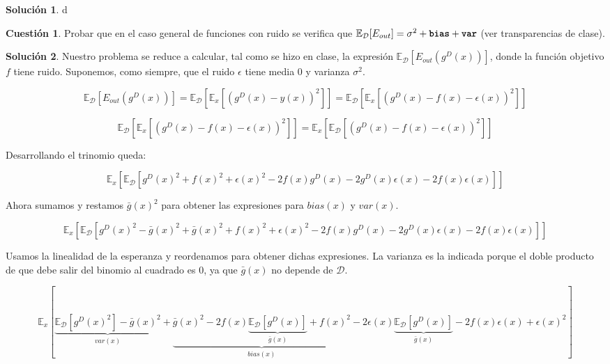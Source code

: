 \documentclass[a4paper, 11pt]{article}
\theoremstyle{definition}
\newtheorem{cuestion}{Cuestión}
\newtheorem*{solucion}{Solución}
\begin{document}
  \begin{solucion}
    d
  \end{solucion}

  \begin{cuestion}
    Probar que en el caso general de funciones con ruido se verifica que $\mathbb{E}_{\mathcal{D}}[E_{out}]= \sigma^2+\texttt{\textbf{bias}}+\texttt{\textbf{var}}$ (ver transparencias de clase).

  \end{cuestion}

  \begin{solucion}
    Nuestro problema se reduce a calcular, tal como se hizo en clase, la expresión $\mathbb{E}_{\mathcal{D}}[E_{out}(g^D(x))]$, donde la función objetivo $f$ tiene ruido. Suponemos, como siempre, que el ruido $\epsilon$ tiene media 0 y varianza $\sigma^2$.

    $$\mathbb{E}_{\mathcal{D}}\left[E_{out}\left(g^D(x)\right) \right] = \mathbb{E}_{\mathcal{D}} \left[\mathbb{E}_x \left[ \left(g^D(x) - y(x) \right)^ 2  \right] \right] = \mathbb{E}_{\mathcal{D}} \left[\mathbb{E}_x \left[ \left(g^D(x) - f(x) - \epsilon(x) \right)^ 2  \right] \right] $$

    $$ \mathbb{E}_{\mathcal{D}} \left[\mathbb{E}_x \left[ \left(g^D(x) - f(x) - \epsilon(x) \right)^ 2  \right] \right] = \mathbb{E}_x \left[\mathbb{E}_{\mathcal{D}} \left[ \left(g^D(x) - f(x) - \epsilon(x) \right)^ 2  \right] \right] $$

    Desarrollando el trinomio queda:

    $$ \mathbb{E}_x \left[\mathbb{E}_{\mathcal{D}} \left[ g^D(x)^2 + f(x)^2 + \epsilon(x)^2 - 2f(x)g^D(x) - 2g^D(x)\epsilon(x) - 2f(x)\epsilon(x) \right] \right]  $$

    Ahora sumamos y restamos $\bar{g}(x)^2$ para obtener las expresiones para $bias(x)$ y $var(x)$.

    $$ \mathbb{E}_x \left[\mathbb{E}_{\mathcal{D}} \left[ g^D(x)^2 - \bar{g}(x)^2 + \bar{g}(x)^2 + f(x)^2 + \epsilon(x)^2 - 2f(x)g^D(x) - 2g^D(x)\epsilon(x) - 2f(x)\epsilon(x) \right] \right] $$

    Usamos la linealidad de la esperanza y reordenamos para obtener dichas expresiones. La varianza es la indicada porque el doble producto de que debe salir del binomio al cuadrado es $0$, ya que $\bar{g}(x)$ no depende de $\mathcal{D}$.

    $$ \mathbb{E}_x \left[ \underbrace{\mathbb{E}_{\mathcal{D}} \left[ g^D(x)^2 \right] - \bar{g}(x)^2}_{var(x)} + \underbrace{\bar{g}(x)^2 - 2f(x) \underbrace{\mathbb{E}_{\mathcal{D}}  \left[g^D(x) \right]}_{\bar{g}(x)} + f(x)^2}_{bias(x)} - 2\epsilon(x) \underbrace{\mathbb{E}_{\mathcal{D}}  \left[g^D(x) \right]}_{\bar{g}(x)} - 2f(x)\epsilon(x) + \epsilon(x)^2 \right] $$


\end{solucion}
\end{document}
